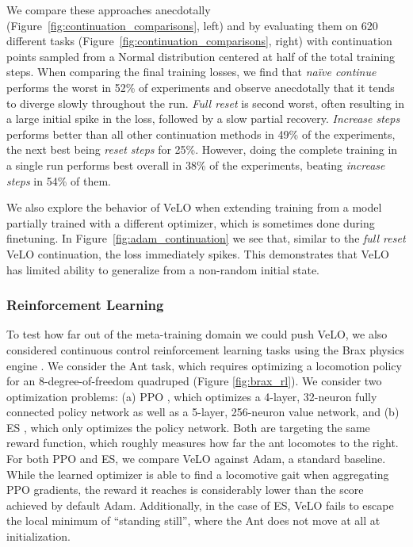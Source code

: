 \documentclass[11pt]{article}
\begin{document}
We compare these approaches anecdotally (Figure~\ref{fig:continuation_comparisons}, left) and by evaluating them on 620 different tasks (Figure~\ref{fig:continuation_comparisons}, right) with continuation points sampled from a Normal distribution centered at half of the total training steps. When comparing the final training losses, we find that \emph{na\"ive continue} performs the worst in 52\% of experiments and observe anecdotally that it tends to diverge slowly throughout the run. \emph{Full reset} is second worst, often resulting in a large initial spike in the loss, followed by a slow partial recovery. \emph{Increase steps} performs better than all other continuation methods in 49\% of the experiments, the next best being \emph{reset steps} for 25\%. However, doing the complete training in a single run performs best overall in 38\% of the experiments, beating \emph{increase steps} in 54\% of them.

We also explore the behavior of VeLO when extending training from a model partially trained with a different optimizer, which is sometimes done during finetuning. In Figure~\ref{fig:adam_continuation} we see that, similar to the \emph{full reset} VeLO continuation, the loss immediately spikes. This demonstrates that VeLO has limited ability to generalize from a non-random initial state.

\subsubsection{Reinforcement Learning}

To test how far out of the meta-training domain we could push VeLO, we also considered continuous control reinforcement learning tasks using the Brax physics engine \citep{freeman2021brax}. We consider the Ant task, which requires optimizing a locomotion policy for an 8-degree-of-freedom quadruped (Figure \ref{fig:brax_rl}). We consider two optimization problems: (a) PPO \citep{schulman2017proximal}, which optimizes a 4-layer, 32-neuron fully connected policy network as well as a 5-layer, 256-neuron value network, and (b) ES \citep{rechenberg1973evolutionsstrategie}, which only optimizes the policy network. Both are targeting the same reward function, which roughly measures how far the ant locomotes to the right. For both PPO and ES, we compare VeLO against Adam, a standard baseline. While the learned optimizer is able to find a locomotive gait when aggregating PPO gradients, the reward it reaches is considerably lower than the score achieved by default Adam. Additionally, in the case of ES, VeLO fails to escape the local minimum of ``standing still'', where the Ant does not move at all at initialization.
\end{document}
